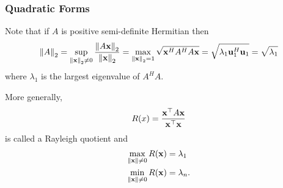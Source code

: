 \documentclass{beamer}
\begin{document}
\begin{frame}\frametitle{Quadratic Forms}
	Note that if $A$ is positive semi-definite Hermitian then
	\begin{align*}
		\left\|A\right\|_2 
			= \sup_{\left\|\mathbf{x}\right\|_2\neq 0}\frac{\left\|A\mathbf{x}\right\|_2}{\left\|\mathbf{x}\right\|_2} 
			= \max_{\left\|\mathbf{x}\right\|_2 = 1} \sqrt{\mathbf{x}^H A^H A\mathbf{x}} 
			= \sqrt{\lambda_1 \mathbf{u}_1^H \mathbf{u}_1} 
			= \sqrt{\lambda_1} 
	\end{align*}
	where $\lambda_1$ is the largest eigenvalue of $A^H A$.
	
	\vfill
	
	More generally,
	\[ 
		R(x) = \frac{\mathbf{x}^\top A\mathbf{x}}{\mathbf{x}^\top \mathbf{x}} 
	\] 
	is called a Rayleigh quotient and
	\begin{align*}
		\max_{\left\|\mathbf{x}\right\|\neq 0} R(\mathbf{x}) &= \lambda_1 \\
		\min_{\left\|\mathbf{x}\right\|\neq 0} R(\mathbf{x}) &= \lambda_n.
	\end{align*}
\end{frame}
\end{document}
